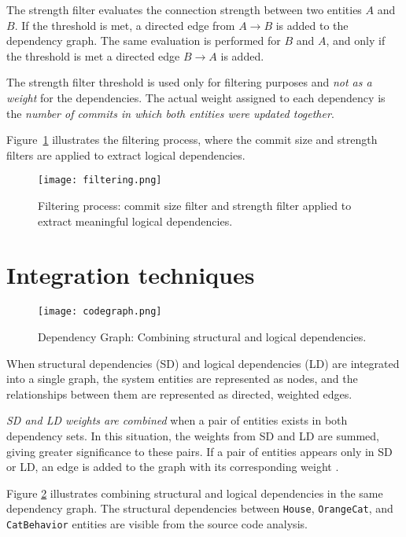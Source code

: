 The strength filter evaluates the connection strength between two entities $A$ and $B$. If the threshold is met, a directed edge from $A \rightarrow B$ is added to the dependency graph. The same evaluation is performed for $B$ and $A$, and only if the threshold is met a directed edge $B \rightarrow A$ is added.

The strength filter threshold is used only for filtering purposes and \textit{not as a weight} for the dependencies. The actual weight assigned to each dependency is the \textit{number of commits in which both entities were updated together}.

Figure~\ref{fig:filtering_process} illustrates the filtering process, where the commit size and strength filters are applied to extract logical dependencies.

\begin{figure}[h!]
    \centering
    \texttt{[image: filtering.png]}
    \caption{Filtering process: commit size filter and strength filter applied to extract meaningful logical dependencies.}
    \label{fig:filtering_process}
\end{figure}

\section{Integration techniques}
\label{sec:integration_techniques}



\begin{figure}[t!]
  \centering
  \texttt{[image: codegraph.png]}
  \caption{Dependency Graph: Combining structural and logical dependencies.}
  \label{fig:codegraph}
\end{figure}

\hspace{4em}When structural dependencies (SD) and logical dependencies (LD) are integrated into a single graph, the system entities are represented as nodes, and the relationships between them are represented as directed, weighted edges. 

\textit{SD and LD weights are combined} when a pair of entities exists in both dependency sets. In this situation, the weights from SD and LD are summed, giving greater significance to these pairs. If a pair of entities appears only in SD or LD, an edge is added to the graph with its corresponding weight \cite{cluster-access}.

Figure \ref{fig:codegraph} illustrates combining structural and logical dependencies in the same dependency graph. The structural dependencies between \texttt{House}, \texttt{OrangeCat}, and \texttt{CatBehavior} entities are visible from the source code analysis.

